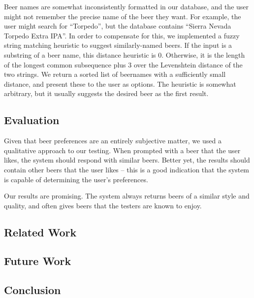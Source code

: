 \documentclass[11pt]{article}
\begin{document}
\begin{itemize}
  Beer names are somewhat inconsistently formatted in our database, and the user might not remember the precise name of the beer they want. For example, the user might search for ``Torpedo'', but the database contains ``Sierra Nevada Torpedo Extra IPA''. In order to compensate for this, we implemented a fuzzy string matching heuristic to suggest similarly-named beers. If the input is a substring of a beer name, this distance heuristic is 0. Otherwise, it is the length of the longest common subsequence plus 3 over the Levenshtein distance of the two strings. We return a sorted list of beernames with a sufficiently small distance, and present these to the user as options. The heuristic is somewhat arbitrary, but it usually suggests the desired beer as the first result.
\end{itemize}
\subsection*{Evaluation}
Given that beer preferences are an entirely subjective matter, we used a qualitative approach to our testing. When prompted with a beer that the user likes, the system should respond with similar beers. Better yet, the results should contain other beers that the user likes -- this is a good indication that the system is capable of determining the user's preferences.

Our results are promising. The system always returns beers of a similar style and quality, and often gives beers that the testers are known to enjoy.
\subsection*{Related Work}

\subsection*{Future Work}

\subsection*{Conclusion}
\end{document}
